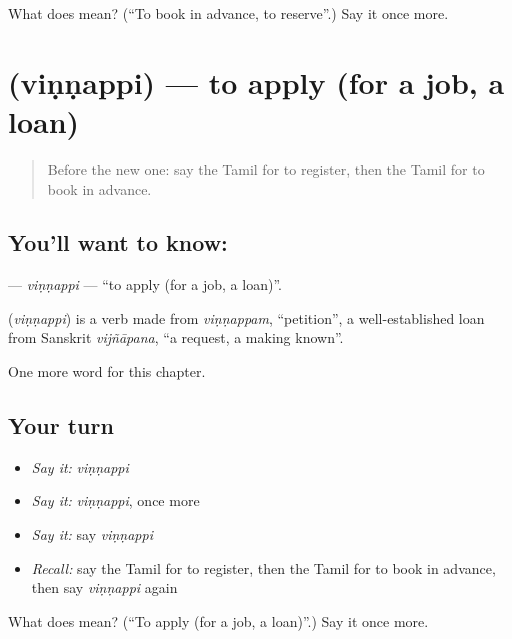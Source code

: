 \begin{tcolorbox}[breakable,colback=teal!4,colframe=teal!35!black,title={Before you move on}]
What does   mean? (\textquotedblleft{}To book in advance, to reserve\textquotedblright{}.) Say it once more.
\end{tcolorbox}
\section[\texorpdfstring{\ta{விண்ணப்பி} (viṇṇappi)}{விண்ணப்பி (viṇṇappi)}]{ (viṇṇappi) — to apply (for a job, a loan)}

\label{lesson:TA-C227-vinnappi}



\begin{quote}
Before the new one: say the Tamil for to register, then the Tamil for to book in advance.
\end{quote}

\subsection*{You'll want to know: }
\textbf{} — \emph{viṇṇappi} — \textquotedblleft{}to apply (for a job, a loan)\textquotedblright{}.

\begin{cousinweb}
\textbf{} (\emph{viṇṇappi}) is a verb made from \emph{viṇṇappam}, \textquotedblleft{}petition\textquotedblright{}, a well-established loan from Sanskrit \emph{vijñāpana}, \textquotedblleft{}a request, a making known\textquotedblright{}.
\end{cousinweb}

\begin{grammarlens}[title={What you've built}]
One more word for this chapter.
\end{grammarlens}

\subsection*{Your turn}
\begin{itemize}
\raggedright
  \item \emph{Say it:} \emph{viṇṇappi}
  \item \emph{Say it:} \emph{viṇṇappi}, once more
  \item \emph{Say it:} say \emph{viṇṇappi}
  \item \emph{Recall:} say the Tamil for to register, then the Tamil for to book in advance, then say \emph{viṇṇappi} again
\end{itemize}

\begin{tcolorbox}[breakable,colback=teal!4,colframe=teal!35!black,title={Before you move on}]
What does  mean? (\textquotedblleft{}To apply (for a job, a loan)\textquotedblright{}.) Say it once more.
\end{tcolorbox}
